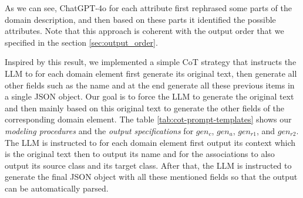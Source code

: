 As we can see, ChatGPT-4o for each attribute first rephrased some parts of the domain description, and then based on these parts it identified the possible attributes. Note that this approach is coherent with the output order that we specified in the section \ref{sec:output_order}.

Inspired by this result, we implemented a simple CoT strategy that instructs the LLM to for each domain element first generate its original text, then generate all other fields such as the name and at the end generate all these previous items in a single JSON object. Our goal is to force the LLM to generate the original text and then mainly based on this original text to generate the other fields of the corresponding domain element.
The table \ref{tab:cot-prompt-templates} shows our \emph{modeling procedures} and the \emph{output specifications} for $gen_c$, $gen_a$, $gen_{r1}$, and $gen_{r2}$.
The LLM is instructed to for each domain element first output its context which is the original text then to output its name and for the associations to also output its source class and its target class. After that, the LLM is instructed to generate the final JSON object with all these mentioned fields so that the output can be automatically parsed.


